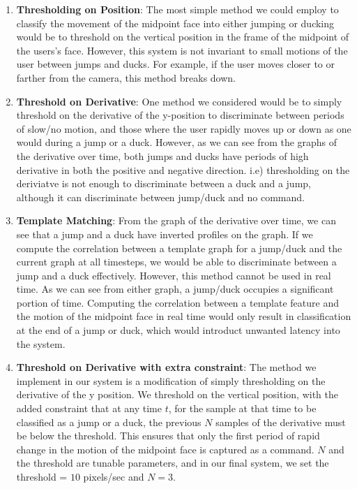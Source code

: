 \documentclass[10pt,twocolumn,letterpaper]{article}
\begin{document}
\begin{enumerate}
    \item \textbf{Thresholding on Position}: The most simple method we could 
        employ to classify the movement of the midpoint face into either jumping 
        or ducking would be to threshold on the vertical position in the frame 
        of the midpoint of the users's face. However, this system is not invariant 
        to small motions of the user between jumps and ducks. For example, if the 
        user moves closer to or farther from the camera, this method breaks down.
    \item \textbf{Threshold on Derivative}: One method we considered would be 
        to simply threshold on the derivative of the y-position to discriminate 
        between periods of slow/no motion, and those where the user rapidly moves 
        up or down as one would during a jump or a duck. However, as we can see from 
        the graphs of the derivative over time, both jumps and ducks have periods of 
        high derivative in both the positive and negative direction. i.e) thresholding 
        on the deriviatve is not enough to discriminate between a duck and a jump, although 
        it can discriminate between jump/duck and no command.
    \item \textbf{Template Matching}: From the graph of the derivative over time, we can 
        see that a jump and a duck have inverted profiles on the graph. If we compute 
        the correlation between a template graph for a jump/duck and the current 
        graph at all timesteps, we would be able to discriminate between a jump and 
        a duck effectively. However, this method cannot be used in real time. As we can 
        see from either graph, a jump/duck occupies a significant portion of time. Computing 
        the correlation between a template feature and the motion of the midpoint face 
        in real time would only result in classification at the end of a jump or duck, which 
        would introduct unwanted latency into the system.
    \item \textbf{Threshold on Derivative with extra constraint}: The 
        method we implement in our system is a modification of simply thresholding on 
        the derivative of the y position. We threshold on the vertical position, with 
        the added constraint that at any time $t$, for the sample at that time to be 
        classified as a jump or a duck, the previous $N$ samples of the 
        derivative must be below the threshold. This ensures that only the 
        first period of rapid change in the motion of the midpoint face is 
        captured as a command. $N$ and the threshold are tunable parameters, 
        and in our final system, we set the threshold = $10$ pixels/sec and 
        $N = 3$.
\end{enumerate}
\end{document}
